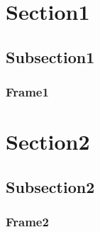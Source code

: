 \documentclass[t,compress,10pt,xcolor=dvipsnames]{beamer}
\begin{document}
    \section{Section1}
    \subsection{Subsection1}
    \frame
    {
        \frametitle{Frame1}
    }

    \section{Section2}
    \subsection{Subsection2}
    \frame
    {
        \frametitle{Frame2}
    }
\end{document}
